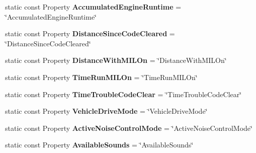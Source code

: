 \begin{DoxyCompactItemize}
\item 
\hypertarget{classVehicleProperty_acd44e058fe296a9d54bcc662085201dd}{static const Property {\bfseries Accumulated\+Engine\+Runtime} = \char`\"{}Accumulated\+Engine\+Runtime\char`\"{}}\label{classVehicleProperty_acd44e058fe296a9d54bcc662085201dd}

\item 
\hypertarget{classVehicleProperty_af3fa9399a934e1d710088bf7ac667445}{static const Property {\bfseries Distance\+Since\+Code\+Cleared} = \char`\"{}Distance\+Since\+Code\+Cleared\char`\"{}}\label{classVehicleProperty_af3fa9399a934e1d710088bf7ac667445}

\item 
\hypertarget{classVehicleProperty_a77013b5a2eb3ff7d3d7df62cadf78074}{static const Property {\bfseries Distance\+With\+M\+I\+L\+On} = \char`\"{}Distance\+With\+M\+I\+L\+On\char`\"{}}\label{classVehicleProperty_a77013b5a2eb3ff7d3d7df62cadf78074}

\item 
\hypertarget{classVehicleProperty_a39f15be7f2bef09c2c504f6b8dd8d9c2}{static const Property {\bfseries Time\+Run\+M\+I\+L\+On} = \char`\"{}Time\+Run\+M\+I\+L\+On\char`\"{}}\label{classVehicleProperty_a39f15be7f2bef09c2c504f6b8dd8d9c2}

\item 
\hypertarget{classVehicleProperty_a57003889143a8781340c619e6a953124}{static const Property {\bfseries Time\+Trouble\+Code\+Clear} = \char`\"{}Time\+Trouble\+Code\+Clear\char`\"{}}\label{classVehicleProperty_a57003889143a8781340c619e6a953124}

\item 
\hypertarget{classVehicleProperty_ac9c2992a72f52d7ab91d79c8b56e906f}{static const Property {\bfseries Vehicle\+Drive\+Mode} = \char`\"{}Vehicle\+Drive\+Mode\char`\"{}}\label{classVehicleProperty_ac9c2992a72f52d7ab91d79c8b56e906f}

\item 
\hypertarget{classVehicleProperty_a3895be1cfc587142494ea9287d340037}{static const Property {\bfseries Active\+Noise\+Control\+Mode} = \char`\"{}Active\+Noise\+Control\+Mode\char`\"{}}\label{classVehicleProperty_a3895be1cfc587142494ea9287d340037}

\item 
\hypertarget{classVehicleProperty_ae9dd0d706b6bce760e9c185a2acbcdea}{static const Property {\bfseries Available\+Sounds} = \char`\"{}Available\+Sounds\char`\"{}}\label{classVehicleProperty_ae9dd0d706b6bce760e9c185a2acbcdea}


\end{DoxyCompactItemize}
